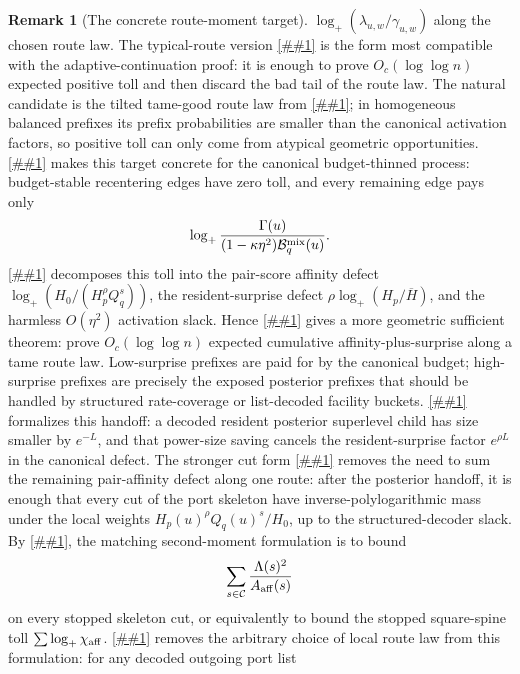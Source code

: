 \documentclass[10pt]{article}
\newcommand{\cref}[1]{\ref{##1}}
\newcommand{\Cref}[1]{\ref{##1}}
\theoremstyle{definition}
\newtheorem{remark}[theorem]{Remark}
\begin{document}
\begin{remark}[The concrete route-moment target]
   $\log_+(\lambda_{u,w}/\gamma_{u,w})$ along the chosen route law. The
   typical-route version \cref{cor:typical-route-law-toll} is the form most
   compatible with the adaptive-continuation proof: it is enough to prove
   $O_c(\log\log n)$ expected positive toll and then discard the bad tail of
   the route law. The natural candidate is the tilted tame-good route law from
   \cref{lem:adaptive-continuation}; in homogeneous balanced prefixes its
   prefix probabilities are smaller than the canonical activation factors, so
   positive toll can only come from atypical geometric opportunities.
   \Cref{cor:canonical-budget-defect-toll} makes this target concrete for the
   canonical budget-thinned process: budget-stable recentering edges have zero
   toll, and every remaining edge pays only
   \[
      \log_+
      \frac{\Gamma(u)}
           {(1-\kappa\eta^2)\mathcal B_q^{\rm mix}(u)} .
   \]
   \Cref{lem:canonical-defect-splitting} decomposes this toll into the
   pair-score affinity defect
   \(\log_+(H_0/(H_p^\rho Q_q^s))\), the resident-surprise defect
   \(\rho\log_+(H_p/\overline H)\), and the harmless
   \(O(\eta^2)\) activation slack.  Hence
   \cref{cor:surprise-defect-route-law} gives a more geometric sufficient
   theorem: prove \(O_c(\log\log n)\) expected cumulative affinity-plus-surprise
   along a tame route law.  Low-surprise prefixes are paid for by the canonical
   budget; high-surprise prefixes are precisely the exposed posterior prefixes
   that should be handled by structured rate-coverage or list-decoded facility
   buckets.  \Cref{lem:posterior-superlevel-cancels-surprise} formalizes this
   handoff: a decoded resident posterior superlevel child has size smaller by
   \(e^{-L}\), and that power-size saving cancels the resident-surprise factor
   \(e^{\rho L}\) in the canonical defect.
   The stronger cut form
   \cref{cor:affinity-cut-posterior-handoff} removes the need to sum the
   remaining pair-affinity defect along one route: after the posterior
   handoff, it is enough that every cut of the port skeleton have
   inverse-polylogarithmic mass under the local weights
   \(H_p(u)^\rho Q_q(u)^s/H_0\), up to the structured-decoder slack.
   By \cref{cor:affinity-cut-energy}, the matching second-moment formulation
   is to bound
   \[
      \sum_{s\in\mathcal C}
      \frac{\Lambda(s)^2}{A_{\rm aff}(s)}
   \]
   on every stopped skeleton cut, or equivalently to bound the stopped
   square-spine toll
   \(\sum\log_+\chi_{\rm aff}\).
   \Cref{cor:affinity-proportional-route-law} removes the arbitrary choice of
   local route law from this formulation: for any decoded outgoing port list

\end{remark}
\end{document}

